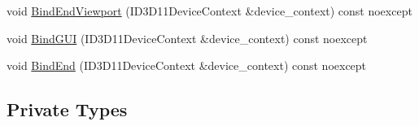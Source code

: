\begin{DoxyCompactItemize}
\item 
void \hyperlink{classmage_1_1rendering_1_1_output_manager_a1b99009331167e4548dbb58695926542}{Bind\+End\+Viewport} (I\+D3\+D11\+Device\+Context \&device\+\_\+context) const noexcept
\item 
void \hyperlink{classmage_1_1rendering_1_1_output_manager_a08be9cc8922f891c8ea4f17559ee40db}{Bind\+G\+UI} (I\+D3\+D11\+Device\+Context \&device\+\_\+context) const noexcept
\item 
void \hyperlink{classmage_1_1rendering_1_1_output_manager_adf8fa859bb168ecf389d56b574a69dbd}{Bind\+End} (I\+D3\+D11\+Device\+Context \&device\+\_\+context) const noexcept
\end{DoxyCompactItemize}
\subsection*{Private Types}

